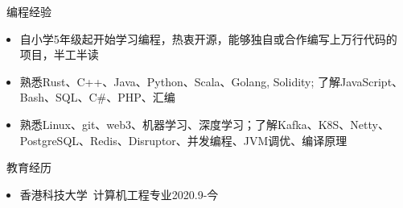 \documentclass[UTF8]{resume}
\begin{document}
  
\begin{rSection}{\faCogs~编程经验}
    \begin{itemize}
        \itemsep -0.5em
        \item 自小学5年级起开始学习编程，热衷开源，能够独自或合作编写上万行代码的项目，半工半读
        \item 熟悉Rust、C++、Java、Python、Scala、Golang, Solidity; 了解JavaScript、Bash、SQL、C\#、PHP、汇编
        \item 熟悉Linux、git、web3、机器学习、深度学习；了解Kafka、K8S、Netty、PostgreSQL、Redis、Disruptor、并发编程、JVM调优、编译原理
    \end{itemize}
    
\end{rSection}
\begin{rSection}{\faGraduationCap~教育经历}
    \begin{itemize}
        \item 香港科技大学~计算机工程专业\hfill 2020.9-今
    \end{itemize}
\end{rSection}
 
\end{document}
